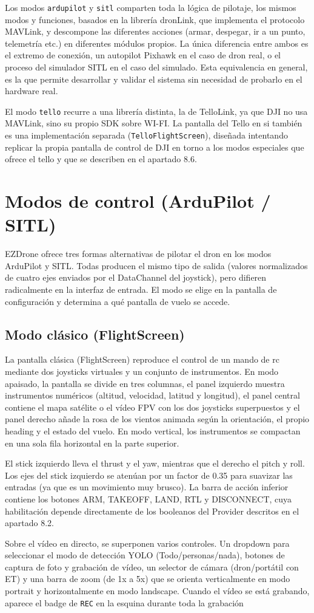 Los modos \texttt{ardupilot} y \texttt{sitl} comparten toda la lógica de pilotaje, los mismos modos y funciones, basados en la librería dronLink, que implementa el protocolo MAVLink, y descompone las diferentes acciones (armar, despegar, ir a un punto, telemetría etc.) en diferentes módulos propios. La única diferencia entre ambos es el extremo de conexión, un autopilot Pixhawk en el caso de dron real, o el proceso del simulador SITL en el caso del simulado. Esta equivalencia en general, es la que permite desarrollar y validar el sistema sin necesidad de probarlo en el hardware real.

El modo \texttt{tello} recurre a una librería distinta, la de TelloLink, ya que DJI no usa MAVLink, sino su propio SDK sobre WI-FI. La pantalla del Tello en si también es una implementación separada (\texttt{TelloFlightScreen}), diseñada intentando replicar la propia pantalla de control de DJI en torno a los modos especiales que ofrece el tello y que se describen en el apartado 8.6.

\section{Modos de control (ArduPilot / SITL)}
EZDrone ofrece tres formas alternativas de pilotar el dron en los modos ArduPilot y SITL. Todas producen el mismo tipo de salida (valores normalizados de cuatro ejes enviados por el DataChannel del joystick), pero difieren radicalmente en la interfaz de entrada. El modo se elige en la pantalla de configuración y determina a qué pantalla de vuelo se accede.

\subsection{Modo clásico (FlightScreen)}
La pantalla clásica (FlightScreen) reproduce el control de un mando de rc mediante dos joysticks virtuales y un conjunto de instrumentos. En modo apaisado, la pantalla se divide en tres columnas, el panel izquierdo muestra instrumentos numéricos (altitud, velocidad, latitud y longitud), el panel central contiene el mapa satélite o el vídeo FPV con los dos joysticks superpuestos y el panel derecho añade la rosa de los vientos animada según la orientación, el propio heading y el estado del vuelo. En modo vertical, los instrumentos se compactan en una sola fila horizontal en la parte superior.

El stick izquierdo lleva el thrust y el yaw, mientras que el derecho el pitch y roll. Los ejes del stick izquierdo se atenúan por un factor de 0.35 para suavizar las entradas (ya que es un movimiento muy brusco). La barra de acción inferior contiene los botones ARM, TAKEOFF, LAND, RTL y DISCONNECT, cuya habilitación depende directamente de los booleanos del Provider descritos en el apartado 8.2.

Sobre el vídeo en directo, se superponen varios controles. Un dropdown para seleccionar el modo de detección YOLO (Todo/personas/nada), botones de captura de foto y grabación de vídeo, un selector de cámara (dron/portátil con ET) y una barra de zoom (de 1x a 5x) que se orienta verticalmente en modo portrait y horizontalmente en modo landscape. Cuando el vídeo se está grabando, aparece el badge de \texttt{REC} en la esquina durante toda la grabación